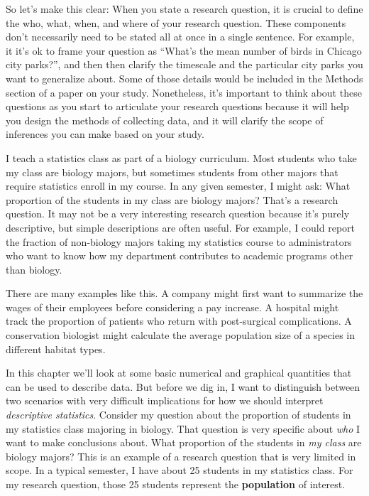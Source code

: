 \documentclass[
]{book}
\begin{document}
So let's make this clear: When you state a research question, it is crucial to define the who, what, when, and where of your research question. These components don't necessarily need to be stated all at once in a single sentence. For example, it it's ok to frame your question as ``What's the mean number of birds in Chicago city parks?'', and then then clarify the timescale and the particular city parks you want to generalize about. Some of those details would be included in the Methods section of a paper on your study. Nonetheless, it's important to think about these questions as you start to articulate your research questions because it will help you design the methods of collecting data, and it will clarify the scope of inferences you can make based on your study.

I teach a statistics class as part of a biology curriculum. Most students who take my class are biology majors, but sometimes students from other majors that require statistics enroll in my course. In any given semester, I might ask: What proportion of the students in my class are biology majors? That's a research question. It may not be a very interesting research question because it's purely descriptive, but simple descriptions are often useful. For example, I could report the fraction of non-biology majors taking my statistics course to administrators who want to know how my department contributes to academic programs other than biology.

There are many examples like this. A company might first want to summarize the wages of their employees before considering a pay increase. A hospital might track the proportion of patients who return with post-surgical complications. A conservation biologist might calculate the average population size of a species in different habitat types.

In this chapter we'll look at some basic numerical and graphical quantities that can be used to describe data. But before we dig in, I want to distinguish between two scenarios with very difficult implications for how we should interpret \emph{descriptive statistics}. Consider my question about the proportion of students in my statistics class majoring in biology. That question is very specific about \emph{who} I want to make conclusions about. What proportion of the students in \emph{my class} are biology majors? This is an example of a research question that is very limited in scope. In a typical semester, I have about 25 students in my statistics class. For my research question, those 25 students represent the \textbf{population} of interest.
\end{document}
